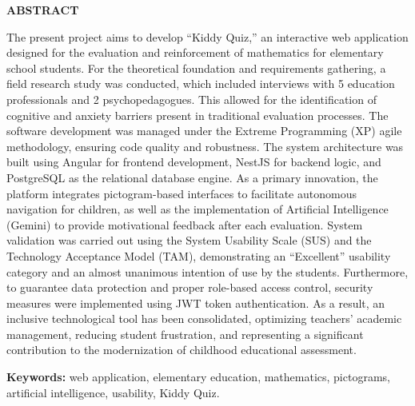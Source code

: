 \begin{center}
    \vspace*{0.5cm}
    {\bfseries ABSTRACT}
\end{center}
\vspace{0.8cm}

\justifying
{}
The present project aims to develop ``Kiddy Quiz,'' an interactive web application designed for the evaluation and reinforcement of mathematics for elementary school students. For the theoretical foundation and requirements gathering, a field research study was conducted, which included interviews with 5 education professionals and 2 psychopedagogues. This allowed for the identification of cognitive and anxiety barriers present in traditional evaluation processes. The software development was managed under the Extreme Programming (XP) agile methodology, ensuring code quality and robustness. The system architecture was built using Angular for frontend development, NestJS for backend logic, and PostgreSQL as the relational database engine. As a primary innovation, the platform integrates pictogram-based interfaces to facilitate autonomous navigation for children, as well as the implementation of Artificial Intelligence (Gemini) to provide motivational feedback after each evaluation. System validation was carried out using the System Usability Scale (SUS) and the Technology Acceptance Model (TAM), demonstrating an ``Excellent'' usability category and an almost unanimous intention of use by the students. Furthermore, to guarantee data protection and proper role-based access control, security measures were implemented using JWT token authentication. As a result, an inclusive technological tool has been consolidated, optimizing teachers' academic management, reducing student frustration, and representing a significant contribution to the modernization of childhood educational assessment.

\vspace{0.5cm}

\noindent\textbf{Keywords:} web application, elementary education, mathematics, pictograms, artificial intelligence, usability, Kiddy Quiz.

\newpage
